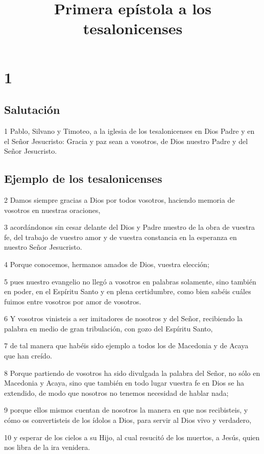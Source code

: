 
\title{Primera epístola a los tesalonicenses}

\chapter{1}

\section*{Salutación}

\par 1 Pablo, Silvano y Timoteo, a la iglesia de los tesalonicenses en Dios Padre y en el Señor Jesucristo: Gracia y paz sean a vosotros, de Dios nuestro Padre y del Señor Jesucristo.

\section*{Ejemplo de los tesalonicenses}

\par 2 Damos siempre gracias a Dios por todos vosotros, haciendo memoria de vosotros en nuestras oraciones,
\par 3 acordándonos sin cesar delante del Dios y Padre nuestro de la obra de vuestra fe, del trabajo de vuestro amor y de vuestra constancia en la esperanza en nuestro Señor Jesucristo.
\par 4 Porque conocemos, hermanos amados de Dios, vuestra elección;
\par 5 pues nuestro evangelio no llegó a vosotros en palabras solamente, sino también en poder, en el Espíritu Santo y en plena certidumbre, como bien sabéis cuáles fuimos entre vosotros por amor de vosotros.
\par 6 Y vosotros vinisteis a ser imitadores de nosotros y del Señor, recibiendo la palabra en medio de gran tribulación, con gozo del Espíritu Santo,
\par 7 de tal manera que habéis sido ejemplo a todos los de Macedonia y de Acaya que han creído.
\par 8 Porque partiendo de vosotros ha sido divulgada la palabra del Señor, no sólo en Macedonia y Acaya, sino que también en todo lugar vuestra fe en Dios se ha extendido, de modo que nosotros no tenemos necesidad de hablar nada;
\par 9 porque ellos mismos cuentan de nosotros la manera en que nos recibisteis, y cómo os convertisteis de los ídolos a Dios, para servir al Dios vivo y verdadero,
\par 10 y esperar de los cielos a su Hijo, al cual resucitó de los muertos, a Jesús, quien nos libra de la ira venidera.

